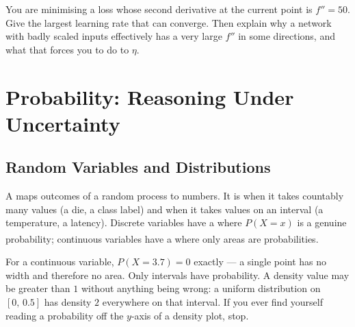 \begin{checkpoint}
You are minimising a loss whose second derivative at the current point is
$f''=50$. Give the largest learning rate that can converge. Then explain why a
network with badly scaled inputs effectively has a very large $f''$ in some
directions, and what that forces you to do to $\eta$.
\end{checkpoint}

\section{Probability: Reasoning Under Uncertainty}

\subsection{Random Variables and Distributions}

A  maps outcomes of a random process to numbers. It is
 when it takes countably many values (a die, a class label)
and  when it takes values on an interval (a temperature, a
latency). Discrete variables have a  where
$P(X=x)$ is a genuine probability; continuous variables have a
 where only areas are
probabilities\textsuperscript{\cite[][ch.~1]{wassermanAllStatistics2004}}.

\begin{cautionbox}
For a continuous variable, $P(X = 3.7) = 0$ exactly --- a single point has no
width and therefore no area. Only intervals have probability. A density value
may be greater than $1$ without anything being wrong: a uniform distribution on
$[0,\,0.5]$ has density $2$ everywhere on that interval. If you ever find
yourself reading a probability off the $y$-axis of a density plot, stop.
\end{cautionbox}

